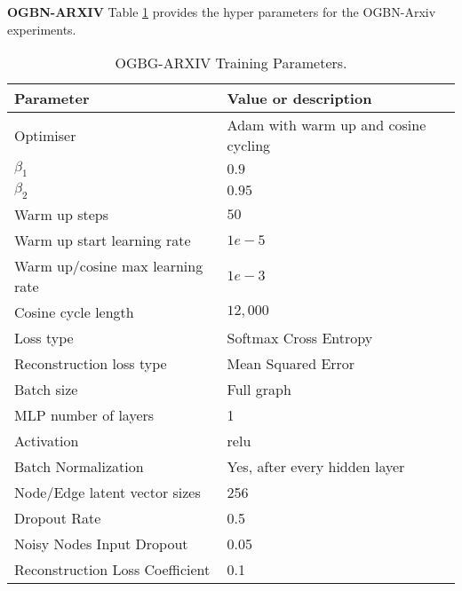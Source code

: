 \documentclass{article} \usepackage{iclr2022_conference,times}
\begin{document}
\textbf{OGBN-ARXIV} Table \ref{arxiv-params} provides the hyper parameters for the OGBN-Arxiv experiments.

\begin{table}[]
\caption{OGBG-ARXIV Training Parameters.}
    \label{arxiv-params}
    \centering
    \begin{tabular}{ll}
      \toprule
       Parameter & Value or description \\
       \midrule
       Optimiser & Adam with warm up and cosine cycling \\
       $\beta_1$   & $0.9$ \\              
       $\beta_2$   & $0.95$ \\                     
       Warm up steps    & $50$ \\
       Warm up start learning rate    & $1e-5$ \\       
       Warm up/cosine max learning rate    & $1e-3$ \\       
       Cosine cycle length    & $12,000$ \\       
       Loss type & Softmax Cross Entropy \\
       Reconstruction loss type & Mean Squared Error \\
     \midrule
       Batch size & Full graph \\
     \midrule
       MLP number of layers & 1 \\
       Activation & relu \\
       Batch Normalization & Yes, after every hidden layer \\
       Node/Edge latent vector sizes & 256 \\ 
     \midrule
       Dropout Rate & 0.5 \\
       Noisy Nodes Input Dropout & 0.05 \\
       Reconstruction Loss Coefficient & 0.1 \\
    \bottomrule

\end{tabular}
\end{table}
\end{document}
